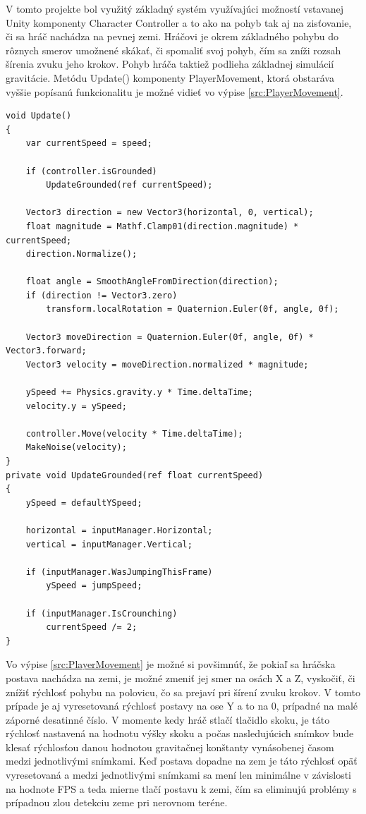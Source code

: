 \documentclass[slovak, master]{diploma}
\begin{document}
V tomto projekte bol využitý základný systém využívajúci možností vstavanej Unity komponenty Character Controller a to ako na pohyb tak aj na zisťovanie, či sa hráč nachádza na pevnej zemi. Hráčovi je okrem základného pohybu do rôznych smerov umožnené skákať, či spomaliť svoj pohyb, čím sa zníži rozsah šírenia zvuku jeho krokov. Pohyb hráča taktiež podlieha základnej simulácií gravitácie. Metódu Update() komponenty PlayerMovement, ktorá obstaráva vyššie popísanú funkcionalitu je možné vidieť vo výpise \ref{src:PlayerMovement}.

\vspace{8pt}
\begin{lstlisting}[label=src:PlayerMovement,caption={Metódy komponenty PlayerMovement obstarávajúce pohyb hráčskej postavy}]
void Update()
{
    var currentSpeed = speed;

    if (controller.isGrounded)
        UpdateGrounded(ref currentSpeed);

    Vector3 direction = new Vector3(horizontal, 0, vertical);
    float magnitude = Mathf.Clamp01(direction.magnitude) * currentSpeed;
    direction.Normalize();

    float angle = SmoothAngleFromDirection(direction);
    if (direction != Vector3.zero)
        transform.localRotation = Quaternion.Euler(0f, angle, 0f);

    Vector3 moveDirection = Quaternion.Euler(0f, angle, 0f) * Vector3.forward;
    Vector3 velocity = moveDirection.normalized * magnitude;

    ySpeed += Physics.gravity.y * Time.deltaTime;
    velocity.y = ySpeed;

    controller.Move(velocity * Time.deltaTime);
    MakeNoise(velocity);
}
private void UpdateGrounded(ref float currentSpeed)
{
    ySpeed = defaultYSpeed;

    horizontal = inputManager.Horizontal;
    vertical = inputManager.Vertical;

    if (inputManager.WasJumpingThisFrame)
        ySpeed = jumpSpeed;

    if (inputManager.IsCrounching)
        currentSpeed /= 2;
}
\end{lstlisting}

Vo výpise \ref{src:PlayerMovement} je možné si povšimnúť, že pokiaľ sa hráčska postava nachádza na zemi, je možné zmeniť jej smer na osách X a Z, vyskočiť, či znížiť rýchlosť pohybu na polovicu, čo sa prejaví pri šírení zvuku krokov. V tomto prípade je aj vyresetovaná rýchlosť postavy na ose Y a to na 0, prípadné na malé záporné desatinné číslo. V momente kedy hráč stlačí tlačidlo skoku, je táto rýchlosť nastavená na hodnotu výšky skoku a počas nasledujúcich snímkov bude klesať rýchlosťou danou hodnotou gravitačnej konštanty vynásobenej časom medzi jednotlivými snímkami. Keď postava dopadne na zem je táto rýchlosť opäť vyresetovaná a medzi jednotlivými snímkami sa mení len minimálne v závislosti na hodnote FPS a teda mierne tlačí postavu k zemi, čím sa eliminujú problémy s prípadnou zlou detekciu zeme pri nerovnom teréne.
\end{document}
